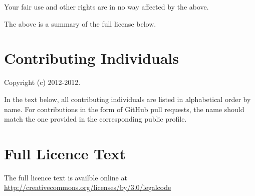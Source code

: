 \documentclass[a4paper,10pt,twoside]{book}
\begin{document}
\noindent Your fair use and other rights are in no way affected by the above.

\noindent The above is a summary of the full license below.

\newpage
\section{Contributing Individuals}

Copyright (c) 2012-2012.

\noindent In the text below, all contributing individuals are listed in alphabetical order by name. 
For contributions in the form of GitHub pull requests, the name should match the one provided in the corresponding public profile.

\noindent


\section{Full Licence Text}

The full licence text is availble online at 
\url{http://creativecommons.org/licenses/by/3.0/legalcode}





\ifx\wholebook\relax\else
   
   
\end{document}
